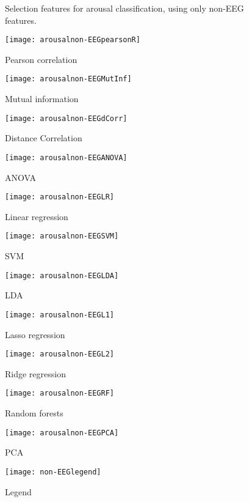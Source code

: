 \clearpage
\begin{figure}[!tbp]
  \centering
  \caption{Selection features for arousal classification, using only non-EEG features.\label{arousalnon-EEGpies}}
  \begin{minipage}[b]{0.3\textwidth}
    \texttt{[image: arousalnon-EEGpearsonR]}
    \caption{Pearson correlation}
  \end{minipage}
  \hfill
  \begin{minipage}[b]{0.3\textwidth}
    \texttt{[image: arousalnon-EEGMutInf]}
    \caption{Mutual information}
  \end{minipage}
  \hfill
  \begin{minipage}[b]{0.3\textwidth}
    \texttt{[image: arousalnon-EEGdCorr]}
    \caption{Distance Correlation}
  \end{minipage}
  
  \begin{minipage}[b]{0.3\textwidth}
    \texttt{[image: arousalnon-EEGANOVA]}
    \caption{ANOVA}
  \end{minipage}
  \hfill
  \begin{minipage}[b]{0.3\textwidth}
    \texttt{[image: arousalnon-EEGLR]}
    \caption{Linear regression}
  \end{minipage}
  \hfill
  \begin{minipage}[b]{0.3\textwidth}
    \texttt{[image: arousalnon-EEGSVM]}
    \caption{SVM}
  \end{minipage}
  
  \begin{minipage}[b]{0.3\textwidth}
    \texttt{[image: arousalnon-EEGLDA]}
    \caption{LDA}
  \end{minipage}
  \hfill
  \begin{minipage}[b]{0.3\textwidth}
    \texttt{[image: arousalnon-EEGL1]}
    \caption{Lasso regression}
  \end{minipage}
  \hfill
  \begin{minipage}[b]{0.3\textwidth}
    \texttt{[image: arousalnon-EEGL2]}
    \caption{Ridge regression}
  \end{minipage}
  
  \begin{minipage}[b]{0.3\textwidth}
    \texttt{[image: arousalnon-EEGRF]}
    \caption{Random forests}
  \end{minipage}
  \hfill
  \begin{minipage}[b]{0.3\textwidth}
    \texttt{[image: arousalnon-EEGPCA]} %
    \caption{PCA}
  \end{minipage}
  \hfill
  \begin{minipage}[b]{0.3\textwidth}
    \texttt{[image: non-EEGlegend]}
    \caption{Legend\label{arousalpieslegend}}
  \end{minipage}
\end{figure}

